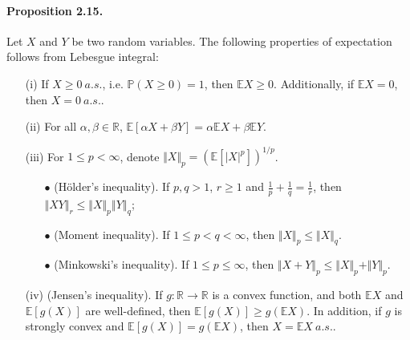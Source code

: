 \documentclass{article}
\numberwithin{equation}{section}
\newcommand{\E}{\mathbb{E}}
\renewcommand{\P}{\mathbb{P}}
\theoremstyle{plain}
\theoremstyle{definition}
\begin{document}
\paragraph{Proposition 2.15.\label{prop:2.15}} Let $X$ and $Y$ be two random variables. The following properties of expectation follows from Lebesgue integral:
\begin{itemize}
	\item[(i)] If $X\geq 0\ a.s.$, i.e. $\P(X\geq 0)=1$, then $\E X\geq 0$. Additionally, if $\E X=0$, then $X=0\ a.s.$.
	\item[(ii)] For all $\alpha,\beta\in\mathbb{R}$, $\E[\alpha X+\beta Y]=\alpha \E X + \beta \E Y$. 
	\item[(iii)] For $1\leq p <\infty$, denote $\Vert X\Vert_p = \left(\E[\vert X\vert^p]\right)^{1/p}$.
	\begin{itemize}
		\item[$\bullet$] (Hölder's inequality). If $p,q>1$, $r\geq 1$ and $\frac{1}{p}+\frac{1}{q}=\frac{1}{r}$, then $\Vert XY\Vert_r\leq\Vert X\Vert_p\left\Vert Y\right\Vert_q$;
		\item[$\bullet$] (Moment inequality). If $1\leq p<q<\infty$, then $\Vert X\Vert_p\leq\Vert X\Vert_q$.
		\item[$\bullet$] (Minkowski's inequality). If $1\leq p\leq\infty$, then $\Vert X+Y\Vert_p \leq\Vert X\Vert_p + \Vert Y\Vert_p$.
	\end{itemize}
    \item[(iv)] (Jensen's inequality). If $g:\mathbb{R}\to\mathbb{R}$ is a convex function, and both $\E X$ and $\E[g(X)]$ are well-defined, then $\E[g(X)]\geq g(\E X)$. In addition, if $g$ is strongly convex and $\E[g(X)]=g(\E X)$, then $X=\E X\ a.s.$.
\end{itemize}
\end{document}
